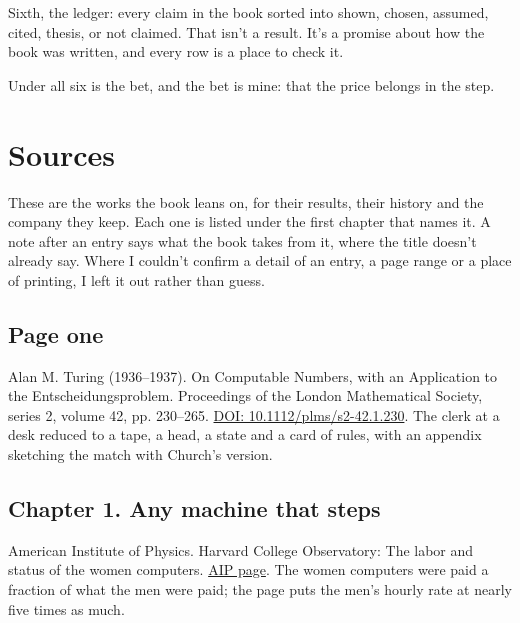 \documentclass[11pt,twoside]{article}
\theoremstyle{thielethm}
\theoremstyle{thieledef}
\theoremstyle{thieledef}
\theoremstyle{thieledef}
\theoremstyle{thielethm}
\theoremstyle{thieleobs}
\theoremstyle{thielethm}
\begin{document}
Sixth, the ledger: every claim in the book sorted into shown, chosen, assumed, cited, thesis, or not claimed. That isn't a result. It's a promise about how the book was written, and every row is a place to check it.

Under all six is the bet, and the bet is mine: that the price belongs in the step.

\section*{Sources}
\label{sec:sources}

These are the works the book leans on, for their results, their history and the company they keep. Each one is listed under the first chapter that names it. A note after an entry says what the book takes from it, where the title doesn't already say. Where I couldn't confirm a detail of an entry, a page range or a place of printing, I left it out rather than guess.

\subsection*{Page one}

\noindent Alan M. Turing (1936--1937). On Computable Numbers, with an Application to the Entscheidungsproblem. Proceedings of the London Mathematical Society, series 2, volume 42, pp. 230--265. \href{https://doi.org/10.1112/plms/s2-42.1.230}{DOI: 10.1112/plms/s2-42.1.230}. The clerk at a desk reduced to a tape, a head, a state and a card of rules, with an appendix sketching the match with Church's version.
\par\medskip

\subsection*{Chapter 1. Any machine that steps}

\noindent American Institute of Physics. Harvard College Observatory: The labor and status of the women computers. \href{https://www.aip.org/history/harvard-observatory/labor-status-women-computers}{AIP page}. The women computers were paid a fraction of what the men were paid; the page puts the men's hourly rate at nearly five times as much.
\par\medskip
\end{document}
